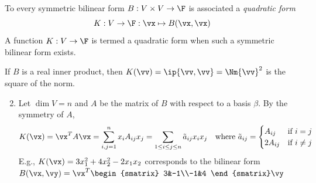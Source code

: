 \goodbreak



\begin{defn}{}{}
To every symmetric bilinear form $B:V\times V\to\F$ is associated a \emph{quadratic form}
\[K:V\to\F:\vx\mapsto B(\vx,\vx)\]
A function $K:V\to\F$ is termed a quadratic form when such a symmetric bilinear form exists.
\end{defn}


\begin{examples}{}{}
\exstart If $B$ is a real inner product, then $K(\vv)=\ip{\vv,\vv}=\Nm{\vv}^2$ is the square of the norm.
\begin{enumerate}\setcounter{enumi}{1}  
  \item Let $\dim V=n$ and $A$ be the matrix of $B$ with respect to a basis $\beta$. By the symmetry of $A$,
  \[K(\vx)=\vx^TA\vx=\sum_{i,j=1}^nx_iA_{ij}x_j =\sum_{1\le i\le j\le n}\tilde a_{ij}x_ix_j
  \quad\text{where}\ \tilde a_{ij}=\begin{cases}
  A_{ij}&\text{if $i=j$}\\
  2A_{ij}&\text{if }i\neq j
  \end{cases}\]
  E.g., $K(\vx)=3x_1^2+4x_2^2-2x_1x_2$ corresponds to the bilinear form $B(\vx,\vy)=\vx^T\begin{smatrix}
  3&-1\\-1&4
  \end{smatrix}\vy$
\end{enumerate}
\end{examples}


